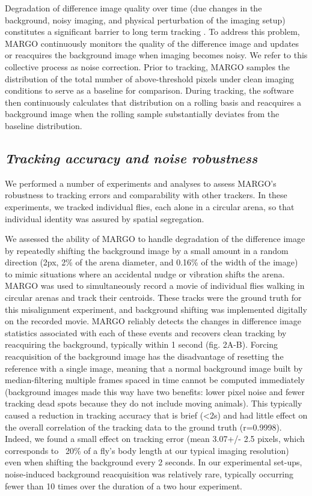 \documentclass[10pt]{article}
\begin{document}
\begin{multicols}{2}
Degradation of difference image quality over time (due changes in the background, noisy imaging, and physical perturbation of the imaging setup) constitutes a significant barrier to long term tracking \cite{Sridhar_Tracktor_2018}. To address this problem, MARGO continuously monitors the quality of the difference image and updates or reacquires the background image when imaging becomes noisy. We refer to this collective process as noise correction. Prior to tracking, MARGO samples the distribution of the total number of above-threshold pixels under clean imaging conditions to serve as a baseline for comparison. During tracking, the software then continuously calculates that distribution on a rolling basis and reacquires a background image when the rolling sample substantially deviates from the baseline distribution.

\subsection*{\textit{Tracking accuracy and noise robustness}}

We performed a number of experiments and analyses to assess MARGO's robustness to tracking errors and comparability with other trackers. In these experiments, we tracked individual flies, each alone in a circular arena, so that individual identity was assured by spatial segregation.

We assessed the ability of MARGO to handle degradation of the difference image by repeatedly shifting the background image by a small amount in a random direction (2px, 2\% of the arena diameter, and 0.16\% of the width of the image) to mimic situations where an accidental nudge or vibration shifts the arena. MARGO was used to simultaneously record a movie of individual flies walking in circular arenas and track their centroids. These tracks were the ground truth for this misalignment experiment, and background shifting was implemented digitally on the recorded movie. MARGO reliably detects the changes in difference image statistics associated with each of these events and recovers clean tracking by reacquiring the background, typically within 1 second (fig. 2A-B). Forcing reacquisition of the background image has the disadvantage of resetting the reference with a single image, meaning that a normal background image built by median-filtering multiple frames spaced in time cannot be computed immediately (background images made this way have two benefits: lower pixel noise and fewer tracking dead spots because they do not include moving animals). This typically caused a reduction in tracking accuracy that is brief (<2s) and had little effect on the overall correlation of the tracking data to the ground truth (r=0.9998). Indeed, we found a small effect on tracking error (mean 3.07+/- 2.5 pixels, which corresponds to ~20\% of a fly's body length at our typical imaging resolution) even when shifting the background every 2 seconds. In our experimental set-ups, noise-induced background reacquisition was relatively rare, typically occurring fewer than 10 times over the duration of a two hour experiment.


\end{multicols}
\end{document}
